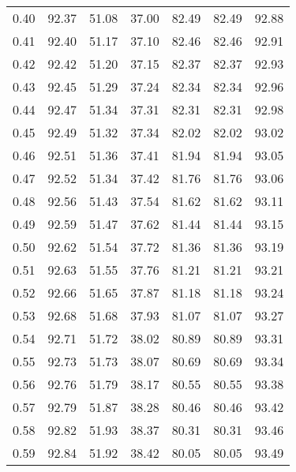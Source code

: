 \begin{tabular}{|c|c|c|c|c|c|c|}
      0.40 &     92.37 &     51.08 &      37.00 &   82.49 &      82.49 &         92.88 \\
      0.41 &     92.40 &     51.17 &      37.10 &   82.46 &      82.46 &         92.91 \\
      0.42 &     92.42 &     51.20 &      37.15 &   82.37 &      82.37 &         92.93 \\
      0.43 &     92.45 &     51.29 &      37.24 &   82.34 &      82.34 &         92.96 \\
      0.44 &     92.47 &     51.34 &      37.31 &   82.31 &      82.31 &         92.98 \\
      0.45 &     92.49 &     51.32 &      37.34 &   82.02 &      82.02 &         93.02 \\
      0.46 &     92.51 &     51.36 &      37.41 &   81.94 &      81.94 &         93.05 \\
      0.47 &     92.52 &     51.34 &      37.42 &   81.76 &      81.76 &         93.06 \\
      0.48 &     92.56 &     51.43 &      37.54 &   81.62 &      81.62 &         93.11 \\
      0.49 &     92.59 &     51.47 &      37.62 &   81.44 &      81.44 &         93.15 \\
      0.50 &     92.62 &     51.54 &      37.72 &   81.36 &      81.36 &         93.19 \\
      0.51 &     92.63 &     51.55 &      37.76 &   81.21 &      81.21 &         93.21 \\
      0.52 &     92.66 &     51.65 &      37.87 &   81.18 &      81.18 &         93.24 \\
      0.53 &     92.68 &     51.68 &      37.93 &   81.07 &      81.07 &         93.27 \\
      0.54 &     92.71 &     51.72 &      38.02 &   80.89 &      80.89 &         93.31 \\
      0.55 &     92.73 &     51.73 &      38.07 &   80.69 &      80.69 &         93.34 \\
      0.56 &     92.76 &     51.79 &      38.17 &   80.55 &      80.55 &         93.38 \\
      0.57 &     92.79 &     51.87 &      38.28 &   80.46 &      80.46 &         93.42 \\
      0.58 &     92.82 &     51.93 &      38.37 &   80.31 &      80.31 &         93.46 \\
      0.59 &     92.84 &     51.92 &      38.42 &   80.05 &      80.05 &         93.49 \\

\end{tabular}
